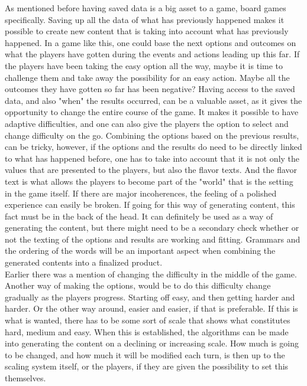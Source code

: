 As mentioned before having saved data is a big asset to a game, board games specifically. Saving up all the data of what has previously happened makes it possible to create new content that is taking into account what has previously happened. In a game like this, one could base the next options and outcomes on what the players have gotten during the events and actions leading up this far. If the players have been taking the easy option all the way, maybe it is time to challenge them and take away the possibility for an easy action. Maybe all the outcomes they have gotten so far has been negative? Having access to the saved data, and also "when" the results occurred, can be a valuable asset, as it gives the opportunity to change the entire course of the game. It makes it possible to have adaptive difficulties, and one can also give the players the option to select and change difficulty on the go. Combining the options based on the previous results, can be tricky, however, if the options and the results do need to be directly linked to what has happened before, one has to take into account that it is not only the values that are presented to the players, but also the flavor texts. And the flavor text is what allows the players to become part of the "world" that is the setting in the game itself. If there are major incoherences, the feeling of a polished experience can easily be broken. If going for this way of generating content, this fact must be in the back of the head. It can definitely be used as a way of generating the content, but there might need to be a secondary check whether or not the texting of the options and results are working and fitting. Grammars and the ordering of the words will be an important aspect when combining the generated contents into a finalized product.\\

Earlier there was a mention of changing the difficulty in the middle of the game. Another way of making the options, would be to do this difficulty change gradually as the players progress. Starting off easy, and then getting harder and harder. Or the other way around, easier and easier, if that is preferable. If this is what is wanted, there has to be some sort of scale that shows what constitutes hard, medium and easy. When this is established, the algorithms can be made into generating the content on a declining or increasing scale. How much is going to be changed, and how much it will be modified each turn, is then up to the scaling system itself, or the players, if they are given the possibility to set this themselves.\\

